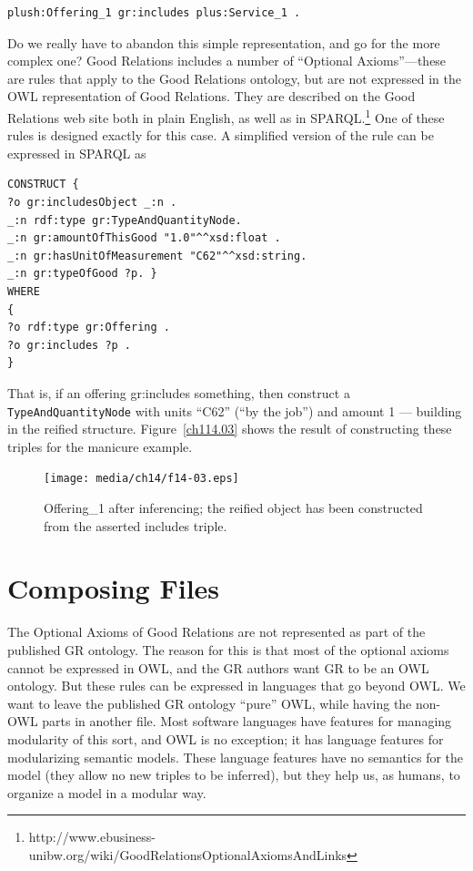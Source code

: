 \begin{lstlisting}
plush:Offering_1 gr:includes plus:Service_1 .
\end{lstlisting}

Do we really have to abandon this simple representation, and go for the
more complex one? Good Relations includes a number of ``Optional
Axioms''---these are rules that apply to the
Good Relations ontology, but are not expressed in the OWL representation
of Good Relations. They are described on the Good Relations web site
both in plain English, as well as in SPARQL.\footnote{http://www.ebusiness-unibw.org/wiki/GoodRelationsOptionalAxiomsAndLinks} One of these rules is
designed exactly for this case. A simplified version of the rule can be
expressed in SPARQL as

\begin{lstlisting}
CONSTRUCT {
?o gr:includesObject _:n .
_:n rdf:type gr:TypeAndQuantityNode.
_:n gr:amountOfThisGood "1.0"^^xsd:float .
_:n gr:hasUnitOfMeasurement "C62"^^xsd:string.
_:n gr:typeOfGood ?p. }
WHERE
{
?o rdf:type gr:Offering .
?o gr:includes ?p . 
}
\end{lstlisting}

That is, if an offering gr:includes something, then construct a
\texttt{TypeAndQuantityNode} with units ``C62'' (``by the job'') and amount
1 --- building in the reified structure. Figure~\ref{ch114.03} shows the result of
constructing these triples for the manicure example.



\begin{figure}
\centering
\texttt{[image: media/ch14/f14-03.eps]}
\caption{Offering\_1 after inferencing; the reified object has been constructed
from the asserted includes triple.
}
\label{fig:ch14.03}
\end{figure}




\section{Composing Files}

The Optional Axioms of Good Relations are not represented as part of the
published GR ontology. The reason for this is that most of the optional
axioms cannot be expressed in OWL, and the GR authors want GR to be an
OWL ontology. But these rules can be expressed in languages that go
beyond OWL. We want to leave the published GR ontology ``pure'' OWL,
while having the non-OWL parts in another file. Most software languages
have features for managing modularity of this sort, and OWL is no
exception; it has language features for modularizing semantic models.
These language features have no semantics for the model (they allow no
new triples to be inferred), but they help us, as humans, to organize a
model in a modular way.

